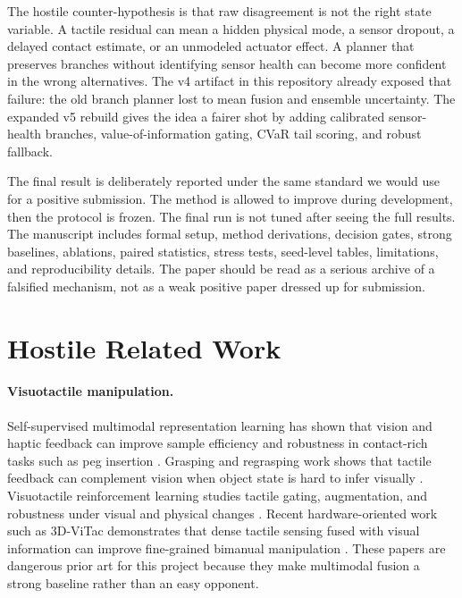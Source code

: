 \documentclass{article}
\begin{document}
The hostile counter-hypothesis is that raw disagreement is not the right state variable. A tactile residual can mean a hidden physical mode, a sensor dropout, a delayed contact estimate, or an unmodeled actuator effect. A planner that preserves branches without identifying sensor health can become more confident in the wrong alternatives. The v4 artifact in this repository already exposed that failure: the old branch planner lost to mean fusion and ensemble uncertainty. The expanded v5 rebuild gives the idea a fairer shot by adding calibrated sensor-health branches, value-of-information gating, CVaR tail scoring, and robust fallback.

The final result is deliberately reported under the same standard we would use for a positive submission. The method is allowed to improve during development, then the protocol is frozen. The final run is not tuned after seeing the full results. The manuscript includes formal setup, method derivations, decision gates, strong baselines, ablations, paired statistics, stress tests, seed-level tables, limitations, and reproducibility details. The paper should be read as a serious archive of a falsified mechanism, not as a weak positive paper dressed up for submission.



\section{Hostile Related Work}

\paragraph{Visuotactile manipulation.}
Self-supervised multimodal representation learning has shown that vision and haptic feedback can improve sample efficiency and robustness in contact-rich tasks such as peg insertion \citep{lee2019,lee2019extended}. Grasping and regrasping work shows that tactile feedback can complement vision when object state is hard to infer visually \citep{calandra2018}. Visuotactile reinforcement learning studies tactile gating, augmentation, and robustness under visual and physical changes \citep{hansen2022}. Recent hardware-oriented work such as 3D-ViTac demonstrates that dense tactile sensing fused with visual information can improve fine-grained bimanual manipulation \citep{huang2024}. These papers are dangerous prior art for this project because they make multimodal fusion a strong baseline rather than an easy opponent.
\end{document}
